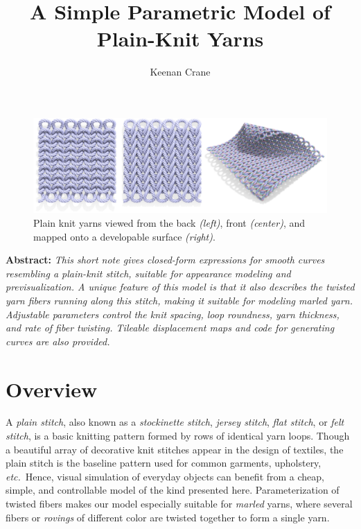\documentclass{article}
\title{A Simple Parametric Model of Plain-Knit Yarns}
\author{Keenan Crane}
\newcommand{\etc}{\emph{etc.}}
\begin{document}
\maketitle

\begin{figure}[h!]
   \centering
   \includegraphics[width=.8\textwidth]{images/teaser.jpg}
   \caption{Plain knit yarns viewed from the back \emph{(left)}, front \emph{(center)}, and mapped onto a developable surface \emph{(right)}.\label{fig:teaser}}
\end{figure}

\textbf{Abstract:} \emph{This short note gives closed-form expressions for smooth curves resembling a plain-knit stitch, suitable for appearance modeling and previsualization.  A unique feature of this model is that it also describes the twisted yarn fibers running along this stitch, making it suitable for modeling marled yarn. Adjustable parameters control the knit spacing, loop roundness, yarn thickness, and rate of fiber twisting.  Tileable displacement maps and code for generating curves are also provided.}

\section{Overview}


A \emph{plain stitch}, also known as a \emph{stockinette stitch}, \emph{jersey stitch}, \emph{flat stitch}, or \emph{felt stitch}, is a basic knitting pattern formed by rows of identical yarn loops.  Though a beautiful array of decorative knit stitches appear in the design of textiles, the plain stitch is the baseline pattern used for common garments, upholstery, \etc{}\  Hence, visual simulation of everyday objects can benefit from a cheap, simple, and controllable model of the kind presented here.  Parameterization of twisted fibers makes our model especially suitable for \emph{marled} yarns, where several fibers or \emph{rovings} of different color are twisted together to form a single yarn.
\end{document}
